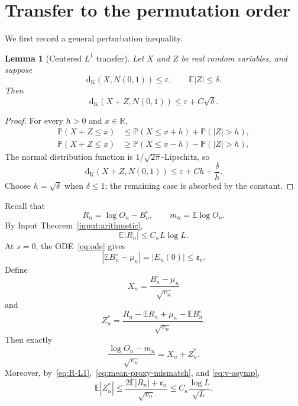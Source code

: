 \documentclass[11pt]{article}
\newtheorem{lemma}[theorem]{Lemma}
\theoremstyle{remark}
\newcommand{\Pp}{\mathbb P}
\newcommand{\Ee}{\mathbb E}
\newcommand{\Kol}{\mathrm d_{\mathrm K}}
\begin{document}
\section{Transfer to the permutation order}

We first record a general perturbation inequality.

\begin{lemma}[Centered $L^1$ transfer]
\label{lem:L1-transfer}
Let $X$ and $Z$ be real random variables, and suppose
\[
 \Kol(X,N(0,1))\le\varepsilon,
 \qquad
 \Ee|Z|\le\delta.
\]
Then
\begin{equation}
\label{eq:L1-transfer}
 \Kol(X+Z,N(0,1))
 \le\varepsilon+C\sqrt\delta.
\end{equation}
\end{lemma}

\begin{proof}
For every $h>0$ and $x\in\mathbb R$,
\begin{align*}
 \Pp(X+Z\le x)
 &\le\Pp(X\le x+h)+\Pp(|Z|>h),\\
 \Pp(X+Z\le x)
 &\ge\Pp(X\le x-h)-\Pp(|Z|>h).
\end{align*}
The normal distribution function is $1/\sqrt{2\pi}$-Lipschitz, so
\[
 \Kol(X+Z,N(0,1))
 \le\varepsilon+Ch+\frac{\delta}{h}.
\]
Choose $h=\sqrt\delta$ when $\delta\le1$; the remaining case is absorbed
by the constant.
\end{proof}

Recall that
\[
 R_n=\log O_n-B_n^\circ,
 \qquad
 m_n=\Ee\log O_n.
\]
By Input Theorem~\ref{input:arithmetic},
\begin{equation}
\label{eq:R-L1}
 \Ee|R_n|\le C_\kappa L\log L.
\end{equation}
At $s=0$, the ODE~\eqref{eq:ode} gives
\begin{equation}
\label{eq:mean-proxy-mismatch}
 |\Ee B_n^\circ-\mu_n|=|E_n(0)|\le\mathfrak e_n.
\end{equation}
Define
\[
 X_n=\frac{B_n^\circ-\mu_n}{\sqrt{v_n}}
\]
and
\begin{equation}
\label{eq:Zn}
 Z_n^*=
 \frac{R_n-\Ee R_n+\mu_n-\Ee B_n^\circ}{\sqrt{v_n}}.
\end{equation}
Then exactly
\begin{equation}
\label{eq:exact-transfer}
 \frac{\log O_n-m_n}{\sqrt{v_n}}=X_n+Z_n^*.
\end{equation}
Moreover, by~\eqref{eq:R-L1},~\eqref{eq:mean-proxy-mismatch}, and
\eqref{eq:v-asymp},
\begin{equation}
\label{eq:Z-L1}
 \Ee|Z_n^*|
 \le\frac{2\Ee|R_n|+\mathfrak e_n}{\sqrt{v_n}}
 \le C_\kappa\frac{\log L}{\sqrt L}.
\end{equation}
\end{document}
